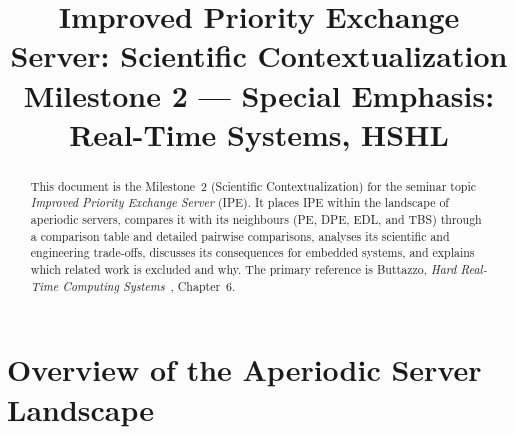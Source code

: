 \documentclass[conference]{IEEEtran}
\begin{document}
\title{Improved Priority Exchange Server: Scientific Contextualization\\
{\footnotesize Milestone 2 --- Special Emphasis: Real-Time Systems, HSHL}}

\author{
}

\maketitle

\begin{abstract}
This document is the Milestone~2 (Scientific Contextualization) for the
seminar topic \emph{Improved Priority Exchange Server} (IPE). It places IPE
within the landscape of aperiodic servers, compares it with its neighbours
(PE, DPE, EDL, and TBS) through a comparison table and detailed pairwise
comparisons, analyses its scientific and engineering trade-offs, discusses
its consequences for embedded systems, and explains which related work is
excluded and why. The primary reference is Buttazzo, \textit{Hard Real-Time
Computing Systems}~\cite{buttazzo}, Chapter~6.
\end{abstract}

\section{Overview of the Aperiodic Server Landscape}
\end{document}
